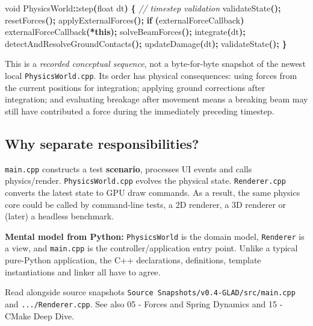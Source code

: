 \documentclass[
  10pt,
  a4paper,
]{article}
\newenvironment{Shaded}{\begin{snugshade}}{\end{snugshade}}
\newcommand{\CommentTok}[1]{\textcolor[rgb]{0.56,0.35,0.01}{\textit{#1}}}
\newcommand{\ControlFlowTok}[1]{\textcolor[rgb]{0.13,0.29,0.53}{\textbf{#1}}}
\newcommand{\DataTypeTok}[1]{\textcolor[rgb]{0.13,0.29,0.53}{#1}}
\newcommand{\KeywordTok}[1]{\textcolor[rgb]{0.13,0.29,0.53}{\textbf{#1}}}
\newcommand{\NormalTok}[1]{#1}
\newcommand{\OperatorTok}[1]{\textcolor[rgb]{0.81,0.36,0.00}{\textbf{#1}}}
\begin{document}
\begin{Shaded}
\begin{Highlighting}[]
\DataTypeTok{void}\NormalTok{ PhysicsWorld}\OperatorTok{::}\NormalTok{step}\OperatorTok{(}\DataTypeTok{float}\NormalTok{ dt}\OperatorTok{)} \OperatorTok{\{}
    \CommentTok{// timestep validation}
\NormalTok{    validateState}\OperatorTok{();}
\NormalTok{    resetForces}\OperatorTok{();}
\NormalTok{    applyExternalForces}\OperatorTok{();}
    \ControlFlowTok{if} \OperatorTok{(}\NormalTok{externalForceCallback}\OperatorTok{)}\NormalTok{ externalForceCallback}\OperatorTok{(*}\KeywordTok{this}\OperatorTok{);}
\NormalTok{    solveBeamForces}\OperatorTok{();}
\NormalTok{    integrate}\OperatorTok{(}\NormalTok{dt}\OperatorTok{);}
\NormalTok{    detectAndResolveGroundContacts}\OperatorTok{();}
\NormalTok{    updateDamage}\OperatorTok{(}\NormalTok{dt}\OperatorTok{);}
\NormalTok{    validateState}\OperatorTok{();}
\OperatorTok{\}}
\end{Highlighting}
\end{Shaded}

This is a \emph{recorded conceptual sequence}, not a byte-for-byte
snapshot of the newest local \texttt{PhysicsWorld.cpp}. Its order has
physical consequences: using forces from the current positions for
integration; applying ground corrections after integration; and
evaluating breakage after movement means a breaking beam may still have
contributed a force during the immediately preceding timestep.

\subsection{Why separate
responsibilities?}\label{why-separate-responsibilities}

\texttt{main.cpp} constructs a test \textbf{scenario}, processes UI
events and calls physics/render. \texttt{PhysicsWorld.cpp} evolves the
physical state. \texttt{Renderer.cpp} converts the latest state to GPU
draw commands. As a result, the same physics core could be called by
command-line tests, a 2D renderer, a 3D renderer or (later) a headless
benchmark.

\textbf{Mental model from Python:} \texttt{PhysicsWorld} is the domain
model, \texttt{Renderer} is a view, and \texttt{main.cpp} is the
controller/application entry point. Unlike a typical pure-Python
application, the C++ declarations, definitions, template instantiations
and linker all have to agree.

Read alongside source snapshots
\texttt{Source\ Snapshots/v0.4-GLAD/src/main.cpp} and
\texttt{.../Renderer.cpp}. See also 05 - Forces and Spring Dynamics and
15 - CMake Deep Dive.
\end{document}

